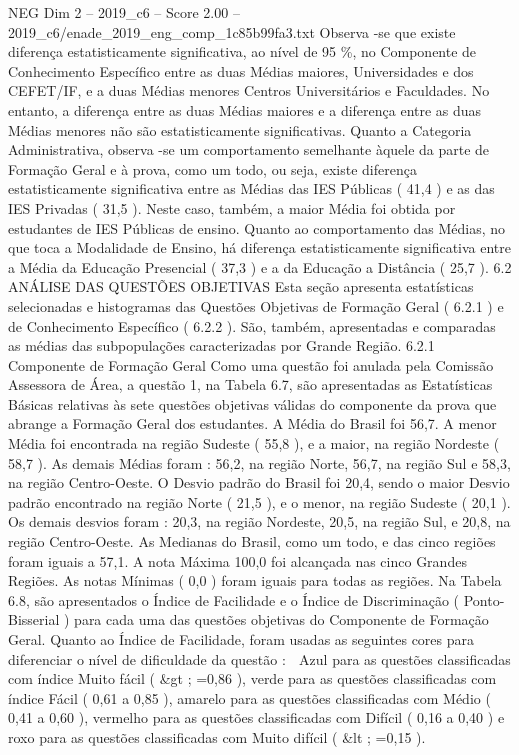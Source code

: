 \begin{textsample}{NEG Dim 2 – 2019\_c6 – Score 2.00 – 2019\_c6/enade\_2019\_eng\_comp\_1c85b99fa3.txt}
Observa -se que existe diferença estatisticamente significativa, ao nível de 95 \%, no Componente de Conhecimento Específico entre as duas Médias maiores, Universidades e dos CEFET/IF, e a duas Médias menores Centros Universitários e Faculdades.
No entanto, a diferença entre as duas Médias maiores e a diferença entre as duas Médias menores não são estatisticamente significativas.
Quanto a Categoria Administrativa, observa -se um comportamento semelhante àquele da parte de Formação Geral e à prova, como um todo, ou seja, existe diferença estatisticamente significativa entre as Médias das IES Públicas ( 41,4 ) e as das IES Privadas ( 31,5 ).
Neste caso, também, a maior Média foi obtida por estudantes de IES Públicas de ensino.
Quanto ao comportamento das Médias, no que toca a Modalidade de Ensino, há diferença estatisticamente significativa entre a Média da Educação Presencial ( 37,3 ) e a da Educação a Distância ( 25,7 ). 6.2 ANÁLISE DAS QUESTÕES OBJETIVAS Esta seção apresenta estatísticas selecionadas e histogramas das Questões Objetivas de Formação Geral ( 6.2.1 ) e de Conhecimento Específico ( 6.2.2 ).
São, também, apresentadas e comparadas as médias das subpopulações caracterizadas por Grande Região. 6.2.1 Componente de Formação Geral Como uma questão foi anulada pela Comissão Assessora de Área, a questão 1, na Tabela 6.7, são apresentadas as Estatísticas Básicas relativas às sete questões objetivas válidas do componente da prova que abrange a Formação Geral dos estudantes.
A Média do Brasil foi 56,7.
A menor Média foi encontrada na região Sudeste ( 55,8 ), e a maior, na região Nordeste ( 58,7 ).
As demais Médias foram : 56,2, na região Norte, 56,7, na região Sul e 58,3, na região Centro-Oeste.
O Desvio padrão do Brasil foi 20,4, sendo o maior Desvio padrão encontrado na região Norte ( 21,5 ), e o menor, na região Sudeste ( 20,1 ).
Os demais desvios foram : 20,3, na região Nordeste, 20,5, na região Sul, e 20,8, na região Centro-Oeste.
As Medianas do Brasil, como um todo, e das cinco regiões foram iguais a 57,1.
A nota Máxima 100,0 foi alcançada nas cinco Grandes Regiões.
As notas Mínimas ( 0,0 ) foram iguais para todas as regiões.
Na Tabela 6.8, são apresentados o Índice de Facilidade e o Índice de Discriminação ( Ponto-Bisserial ) para cada uma das questões objetivas do Componente de Formação Geral.
Quanto ao Índice de Facilidade, foram usadas as seguintes cores para diferenciar o nível de dificuldade da questão :  Azul para as questões classificadas com índice Muito fácil ( \&gt ; =0,86 ), verde para as questões classificadas com índice Fácil ( 0,61 a 0,85 ), amarelo para as questões classificadas com Médio ( 0,41 a 0,60 ), vermelho para as questões classificadas com Difícil ( 0,16 a 0,40 ) e roxo para as questões classificadas com Muito difícil ( \&lt ; =0,15 ).

\end{textsample}
